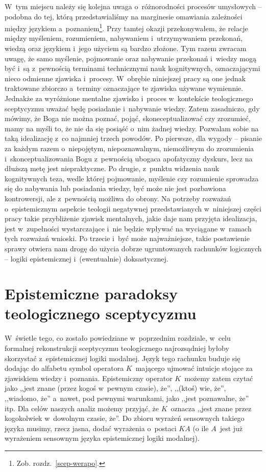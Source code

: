 W~tym miejscu należy się kolejna uwaga o~różnorodności procesów umysłowych -- podobna do tej, którą przedstawialiśmy na marginesie omawiania zależności między językiem a~poznaniem\footnote{Zob. rozdz.~\ref{scep-werapo}.}. Przy tamtej okazji przekonywałem, że relacje między myśleniem, rozumieniem, nabywaniem i~utrzymywaniem przekonań, wiedzą oraz językiem i~jego użyciem są bardzo złożone. Tym razem zwracam uwagę, że samo myślenie, pojmowanie oraz nabywanie przekonań i~wiedzy mogą być i~są z~pewnością terminami technicznymi nauk kognitywnych, oznaczającymi nieco odmienne zjawiska i~procesy. W~obrębie niniejszej pracy są one jednak traktowane zbiorczo a~terminy oznaczające te zjawiska używane wymiennie. Jednakże za wyróżnione mentalne zjawisko i~proces w~kontekście teologicznego sceptycyzmu uważać będę posiadanie i~nabywanie wiedzy. Zatem zasadniczo, gdy mówimy, że Boga nie można poznać, pojąć, skoneceptualizować czy zrozumieć, mamy na myśli to, że nie da się posiąść o~nim żadnej wiedzy. Pozwalam sobie na taką idealizację z~co najmniej trzech powodów.
Po pierwsze, dla wygody -- pisanie za każdym razem o~niepojętym, niepoznawalnym, niemożliwym do zrozumienia i~skonceptualizowania Bogu z~pewnością ubogaca apofatyczny dyskurs, lecz na dłuższą metę jest niepraktyczne. Po drugie, z~punktu widzenia nauk kognitywnych teza, wedle której pojmowanie, myślenie czy rozumienie sprowadza się do nabywania lub posiadania wiedzy, być może nie jest pozbawiona kontrowersji, ale z~pewnością możliwa do obrony. Na potrzeby rozważań o~epistemicznym aspekcie teologii negatywnej przedstawianych w~niniejszej części pracy takie przybliżenie zjawisk mentalnych, jakie daje nam przyjęta idealizacja, jest w~zupełności wystarczające i~nie będzie wpływać na wyciągane w~ramach tych rozważań wnioski. Po trzecie i~być może najważniejsze, takie postawienie sprawy otwiera nam drogę do użycia dobrze ugruntowanych rachunków logicznych -- logiki epistemicznej i~(ewentualnie) doksastycznej.





\chapter{Epistemiczne paradoksy teologicznego sceptycyzmu}

W~świetle tego, co zostało powiedziane w~poprzednim rozdziale, w~celu formalnej rekonstrukcji sceptycyzmu teologicznego najrozsądniej byłoby skorzystać z~epistemicznej logiki modalnej. Język tego rachunku buduje się dodając do alfabetu symbol operatora $K$~mającego ujmować intuicje stojące za zjawiskiem wiedzy i~poznania. Epistemiczny operator $K$~możemy zatem czytać jako ,,jest znane (przez kogoś w~pewnym czasie), że'', ,,(ktoś) wie, że'', ,,wiadomo, że'' a~nawet, pod pewnymi warunkami, jako ,,jest poznawalne, że'' itp. Dla celów naszych analiz możemy przyjąć, że $K$~oznacza ,,jest znane przez kogokolwiek w~dowolnym czasie, że''. Do zbioru wyrażeń sensownych takiego języka musimy, rzecz jasna, dodać wyrażenia o~postaci $KA$ (o ile $A$~jest już wyrażeniem sensownym języka epistemicznej logiki modalnej).

